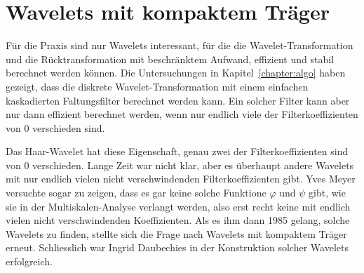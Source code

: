 %
%
%
\chapter{Wavelets mit kompaktem Träger
\label{chapter:kompakt}}
\rhead{}
Für die Praxis sind nur Wavelets interessant, für die die
Wavelet-Transformation und die Rücktransformation mit beschränktem Aufwand,
effizient und stabil berechnet werden können.
Die Untersuchungen in Kapitel~\ref{chapter:algo} haben gezeigt, dass 
die diskrete Wavelet-Transformation mit einem einfachen kaskadierten
Faltungsfilter berechnet werden kann.
Ein solcher Filter kann aber nur dann effizient berechnet werden,
wenn nur endlich viele der Filterkoeffizienten von 0 verschieden sind.

Das Haar-Wavelet hat diese Eigenschaft, genau zwei der Filterkoeffizienten
sind von 0 verschieden.
Lange Zeit war nicht klar, aber es überhaupt andere Wavelets mit
nur endlich vielen nicht verschwindenden Filterkoeffizienten gibt.
Yves Meyer versuchte sogar zu zeigen, dass es gar keine solche Funktione
$\varphi$ und $\psi$ gibt, wie sie in der Multiskalen-Analyse verlangt
werden, also erst recht keine mit endlich vielen nicht verschwindenden
Koeffizienten.
Als es ihm dann 1985 gelang, solche Wavelets zu finden, stellte sich
die Frage nach Wavelets mit kompaktem Träger erneut.
Schliesslich war Ingrid Daubechies in der Konstruktion solcher Wavelets
erfolgreich.








